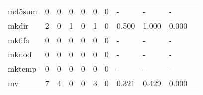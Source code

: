 \begin{longtable}{lp{1.2cm}p{1.2cm}p{1.2cm}p{1.2cm}p{1.2cm}p{1.2cm}p{1.2cm}p{1.2cm}p{1.2cm}p{1.2cm}}
md5sum    &                                     0 &                                                  0 &                                                0 &                                               0 &                                                0 &                                              0 &                                                  - &                                                  - &                                                  - \\
mkdir     &                                     2 &                                                  0 &                                                1 &                                               0 &                                                1 &                                              0 &                                              0.500 &                                              1.000 &                                              0.000 \\
mkfifo    &                                     0 &                                                  0 &                                                0 &                                               0 &                                                0 &                                              0 &                                                  - &                                                  - &                                                  - \\
mknod     &                                     0 &                                                  0 &                                                0 &                                               0 &                                                0 &                                              0 &                                                  - &                                                  - &                                                  - \\
mktemp    &                                     0 &                                                  0 &                                                0 &                                               0 &                                                0 &                                              0 &                                                  - &                                                  - &                                                  - \\
mv        &                                     7 &                                                  4 &                                                0 &                                               0 &                                                3 &                                              0 &                                              0.321 &                                              0.429 &                                              0.000 \\

\end{longtable}
